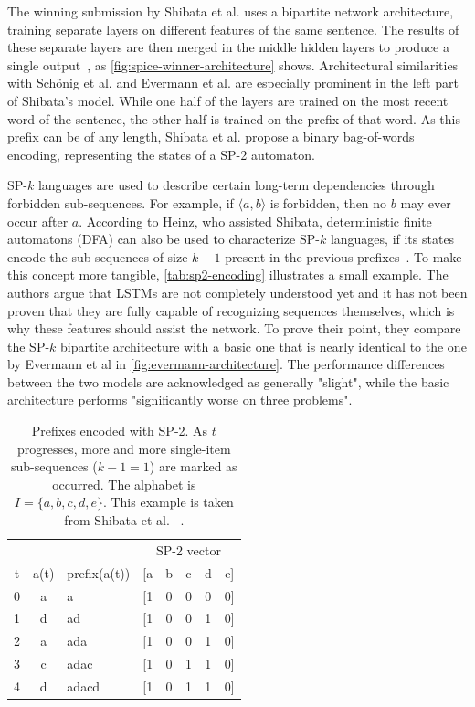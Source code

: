 The winning submission by Shibata et al. uses a bipartite network architecture, training separate layers on different features of the same sentence. The results of these separate layers are then merged in the middle hidden layers to produce a single output~\cite{shibata2016bipartite}, as \autoref{fig:spice-winner-architecture} shows. Architectural similarities with Schönig et al. and Evermann et al. are especially prominent in the left part of Shibata's model.
While one half of the layers are trained on the most recent word of the sentence, the other half is trained on the prefix of that word. As this prefix can be of any length, Shibata et al. propose a binary bag-of-words encoding, representing the states of a SP-2 automaton.

SP-$k$ languages are used to describe certain long-term dependencies through forbidden sub-sequences. For example, if $\langle a,b \rangle$ is forbidden, then no $b$ may ever occur after $a$. According to Heinz, who assisted Shibata, deterministic finite automatons (DFA) can also be used to characterize SP-$k$ languages, if its states encode the sub-sequences of size $k-1$  present in the previous prefixes~\cite{heinz2010estimatingSP}. To make this concept more tangible, \autoref{tab:sp2-encoding} illustrates a small example. The authors argue that LSTMs are not completely understood yet and it has not been proven that they are fully capable of recognizing sequences themselves, which is why these features should assist the network. To prove their point, they compare the SP-$k$ bipartite architecture with a basic one that is nearly identical to the one by Evermann et al in \autoref{fig:evermann-architecture}. The performance differences between the two models are acknowledged as generally "slight", while the basic architecture performs "significantly worse on three problems".\\

\begin{table}[!htb]
    \centering
    \begin{tabular}{cclccccc}
        \hline
          &      &              & \multicolumn{5}{c}{SP-2 vector}\\
        t & a(t) & prefix(a(t)) & [a & b & c & d & e]\\
        \hline
        0 & a    & a            & [1 & 0 & 0 & 0 & 0]\\
        1 & d    & ad           & [1 & 0 & 0 & 1 & 0]\\
        2 & a    & ada          & [1 & 0 & 0 & 1 & 0]\\
        3 & c    & adac         & [1 & 0 & 1 & 1 & 0]\\
        4 & d    & adacd        & [1 & 0 & 1 & 1 & 0]\\
        \hline
    \end{tabular}
    \caption[SP-2 feature vector example]{Prefixes encoded with SP-2. As $t$ progresses, more and more single-item sub-sequences ($k-1=1$) are marked as occurred. The alphabet is $I=\{a,b,c,d,e\}$. This example is taken from Shibata et al. ~\cite{shibata2016bipartite}.}
    \label{tab:sp2-encoding}
\end{table}

